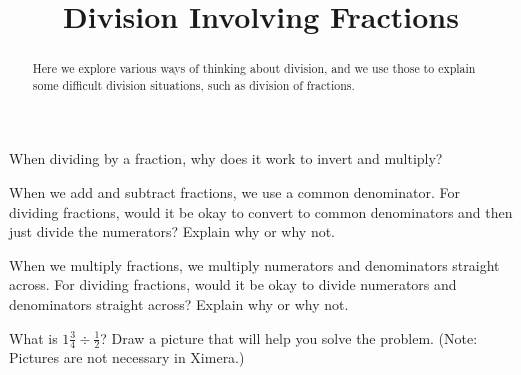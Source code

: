 \documentclass{ximera}
\title{Division Involving Fractions}
\begin{document}
\begin{abstract}
Here we explore various ways of thinking about division, and we use those to explain some difficult division situations, such as division of fractions.
\end{abstract}
\maketitle


\begin{problem}
When dividing by a fraction, why does it work to invert and multiply?
\begin{freeResponse}
\end{freeResponse}
\end{problem}

\begin{problem}
When we add and subtract fractions, we use a common denominator.  For dividing fractions, would it be okay to convert to common denominators and then just divide the numerators?  Explain why or why not. 
\begin{freeResponse}
\end{freeResponse}
\end{problem}


\begin{problem}
When we multiply fractions, we multiply numerators and denominators straight across.  For dividing fractions, would it be okay to divide numerators and denominators straight across?  Explain why or why not. 
\begin{freeResponse}
\end{freeResponse}
\end{problem}

\begin{problem}
What is $1 \frac{3}{4} \div \frac{1}{2}$?  Draw a picture that will help you solve the problem.  (Note: Pictures are not necessary in Ximera.)
\begin{freeResponse}
\end{freeResponse}
\end{problem}
\end{document}
